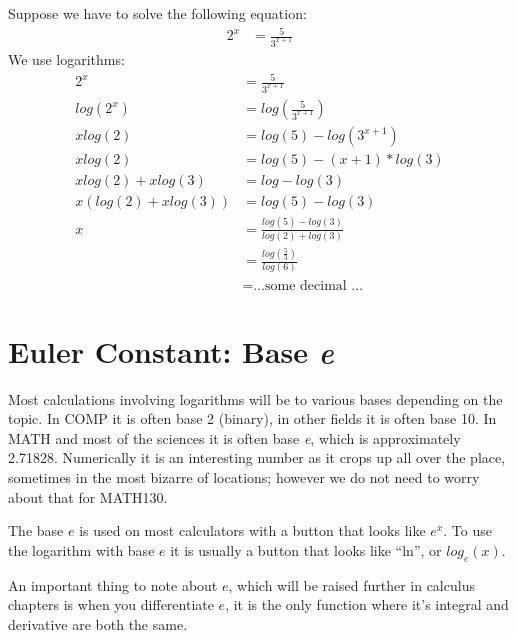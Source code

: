 Suppose we have to solve the following equation:
\begin{align}
  2^{x} & = \frac{5}{3^{x+1}}
\end{align}
We use logarithms:
\begin{align}
  2^{x} & = \frac{5}{3^{x+1}} \\
  log(2^x) & = log(\frac{5}{3^{x+1}}) \\
  x log(2) & = log(5) - log(3^{x+1}) \\
  x log(2) & = log(5) - (x+1) * log(3) \\
  x log(2) + x log(3)  & = log - log(3) \\
  x(log(2) + x log(3)) & = log(5) - log(3) \\
  x & = \frac{log(5) - log(3)}{log(2) + log(3)} \\
    & = \frac{log(\frac{5}{3})}{log(6)} \\
    & = \text{\ldots some decimal \ldots }
\end{align}

\section{Euler Constant: Base \emph{e}}
\label{sec:EulerConstantBaseE}
Most calculations involving logarithms will be to various bases depending on
the topic. In COMP it is often base 2 (binary), in other fields it is often base
10. In MATH and most of the sciences it is often base \emph{e}, which is
approximately 2.71828.\cite{duWGx} Numerically it is an interesting number as it
crops up all over the place, sometimes in the most bizarre of locations; however
we do not need to worry about that for MATH130.

The base $e$ is used on most calculators with a button that looks like $e^x$. To
use the logarithm with base $e$ it is usually a button that looks like ``ln'', or
$log_e(x)$.

An important thing to note about $e$, which will be raised further in calculus
chapters is when you differentiate $e$, it is the only function where it's
integral and derivative are both the same.   